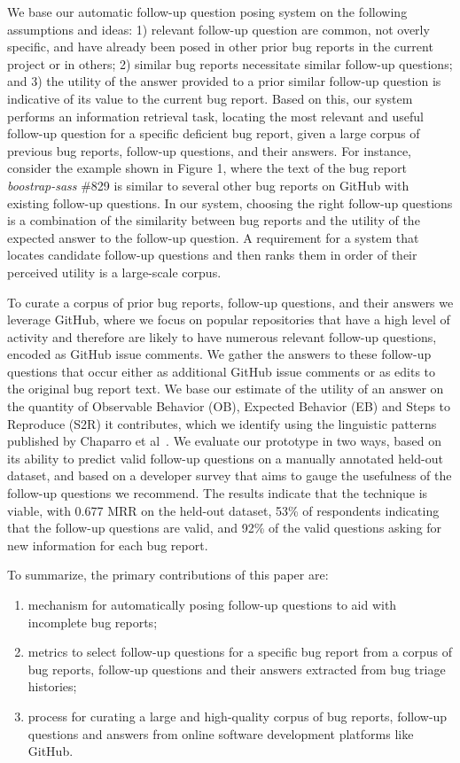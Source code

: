 %
We base our automatic follow-up question posing system on the following assumptions and ideas: 1) relevant follow-up question are common, not overly specific, and have already been posed in other prior bug reports in the current project or in others; 2) similar bug reports necessitate similar follow-up questions; and 3) the utility of the answer provided to a prior similar follow-up question is indicative of its value to the current bug report.
%
Based on this, our system performs an information retrieval task, locating the most relevant and useful follow-up question for a specific deficient bug report, given a large corpus of previous bug reports, follow-up questions, and their answers.
%
For instance, consider the example shown in Figure 1, where the text of the bug report {\em boostrap-sass} \#829 is similar to several other bug reports on GitHub with existing follow-up questions.
%
In our system, choosing the right follow-up questions is a combination of the similarity between bug reports and the utility of the expected answer to the follow-up question.
%
A requirement for a system that locates candidate follow-up questions and then ranks them in order of their perceived utility is a large-scale corpus.

To curate a corpus of prior bug reports, follow-up questions, and their answers we leverage GitHub, where we focus on popular repositories that have a high level of activity and therefore are likely to have numerous relevant follow-up questions, encoded as GitHub issue comments. We gather the answers to these follow-up questions that occur either as additional GitHub issue comments or as edits to the original bug report text. We base our estimate of the utility of an answer on the quantity of Observable Behavior (OB), Expected Behavior (EB) and Steps to Reproduce (S2R) it contributes, which we identify using the linguistic patterns published by Chaparro et al~\cite{chaparro17detecting}. We evaluate our prototype in two ways, based on its ability to predict valid follow-up questions on a manually annotated held-out dataset, and based on a developer survey that aims to gauge the usefulness of the follow-up questions we recommend. The results indicate that the technique is viable, with 0.677 MRR on the held-out dataset, 53\% of respondents indicating that the follow-up questions are valid, and 92\% of the valid questions asking for new information for each bug report.

To summarize, the primary contributions of this paper are:
\begin{enumerate}
\item mechanism for automatically posing follow-up questions to aid with incomplete bug reports;
\item metrics to select follow-up questions for a specific bug report from a corpus of bug reports, follow-up questions and their answers extracted from bug triage histories;
\item process for curating a large and high-quality corpus of bug reports, follow-up questions and answers from online software development platforms like GitHub.
\end{enumerate}

